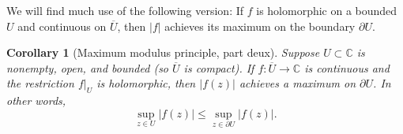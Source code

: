 \documentclass[12pt,openany]{book}
\newcommand{\widebar}[1]{\overline{#1}}
\newcommand{\sabs}[1]{\lvert {#1} \rvert}
\newcommand{\C}{{\mathbb{C}}}
\theoremstyle{plain}
\newtheorem{cor}[thm]{Corollary}
\theoremstyle{remark}
\theoremstyle{definition}
\theoremstyle{exercise}
\theoremstyle{example}
\begin{document}
We will find much use of the following version: If $f$
is holomorphic on a bounded $U$ and continuous on $\widebar{U}$,
then $\sabs{f}$ achieves its maximum on the boundary $\partial U$.

\begin{cor}[Maximum modulus principle, part deux]
\label{cor:maxmodprincpartdeux}
%
%
Suppose $U \subset \C$ is nonempty, open, and bounded (so $\widebar{U}$ is compact).
If $f \colon \widebar{U} \to \C$ is continuous and the restriction $f|_{U}$
is holomorphic, then $\sabs{f(z)}$ achieves a maximum on $\partial U$.  In
other words,
\begin{equation*}
\sup_{z \in U} \sabs{f(z)} \leq
\sup_{z \in \partial U} \sabs{f(z)} .
\end{equation*}
\end{cor}
\end{document}
